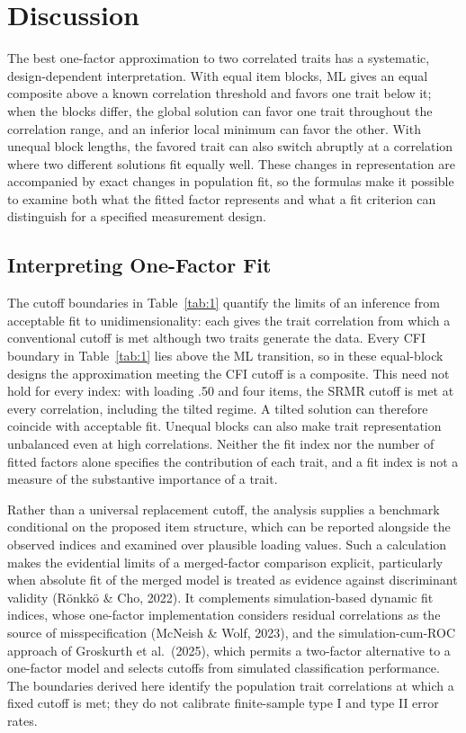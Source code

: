 \section{Discussion}
\label{sec:discussion}

The best one-factor approximation to two correlated traits has a systematic, design-dependent interpretation. With equal item blocks, ML gives an equal composite above a known correlation threshold and favors one trait below it; when the blocks differ, the global solution can favor one trait throughout the correlation range, and an inferior local minimum can favor the other. With unequal block lengths, the favored trait can also switch abruptly at a correlation where two different solutions fit equally well. These changes in representation are accompanied by exact changes in population fit, so the formulas make it possible to examine both what the fitted factor represents and what a fit criterion can distinguish for a specified measurement design.

\subsection{Interpreting One-Factor Fit}

The cutoff boundaries in Table~\ref{tab:1} quantify the limits of an inference from acceptable fit to unidimensionality: each gives the trait correlation from which a conventional cutoff is met although two traits generate the data. Every CFI boundary in Table~\ref{tab:1} lies above the ML transition, so in these equal-block designs the approximation meeting the CFI cutoff is a composite. This need not hold for every index: with loading .50 and four items, the SRMR cutoff is met at every correlation, including the tilted regime. A tilted solution can therefore coincide with acceptable fit. Unequal blocks can also make trait representation unbalanced even at high correlations. Neither the fit index nor the number of fitted factors alone specifies the contribution of each trait, and a fit index is not a measure of the substantive importance of a trait.

Rather than a universal replacement cutoff, the analysis supplies a benchmark conditional on the proposed item structure, which can be reported alongside the observed indices and examined over plausible loading values. Such a calculation makes the evidential limits of a merged-factor comparison explicit, particularly when absolute fit of the merged model is treated as evidence against discriminant validity (R\"onkk\"o \& Cho, 2022). It complements simulation-based dynamic fit indices, whose one-factor implementation considers residual correlations as the source of misspecification (McNeish \& Wolf, 2023), and the simulation-cum-ROC approach of Groskurth et al.\ (2025), which permits a two-factor alternative to a one-factor model and selects cutoffs from simulated classification performance. The boundaries derived here identify the population trait correlations at which a fixed cutoff is met; they do not calibrate finite-sample type I and type II error rates.

